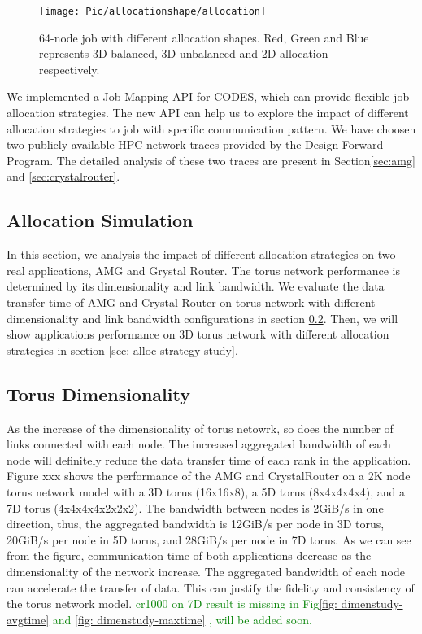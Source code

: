 \documentclass[conference]{IEEEtran}
\begin{document}
\begin{figure}[h!] 
  \centering
  \texttt{[image: Pic/allocationshape/allocation]}
  \caption{64-node job with different allocation shapes. Red, Green and Blue represents 3D balanced, 3D unbalanced and 2D allocation respectively. }
  \label{fig: allocation}
\end{figure}

We implemented a Job Mapping API for CODES, which can provide flexible job allocation strategies. The new API can help us to explore the impact of different allocation strategies to job with specific communication pattern. We have choosen two publicly available HPC network traces provided by the Design Forward Program\cite{design forward webpage}. The detailed analysis of these two traces are present in Section\ref{sec:amg} and \ref{sec:crystalrouter}.


\subsection{Allocation Simulation}
\label{sec:alloc sim}

In this section, we analysis the impact of different allocation strategies on two real applications, AMG and Grystal Router. The torus network performance is determined by its dimensionality and link bandwidth. We evaluate the data transfer time of AMG and Crystal Router on torus network with different dimensionality and link bandwidth configurations in section \ref{sec: dimensionality study}. Then, we will show applications performance on 3D torus network with different allocation strategies in section \ref{sec: alloc strategy study}.

\subsection{Torus Dimensionality}
\label{sec: dimensionality study}

As the increase of the dimensionality of torus netowrk, so does the number of links connected with each node. The increased aggregated bandwidth of each node will definitely reduce the data transfer time of each rank in the application. Figure xxx shows the performance of the AMG and CrystalRouter on a 2K node torus network model with a 3D torus (16x16x8), a 5D torus (8x4x4x4x4), and a 7D torus (4x4x4x4x2x2x2). The bandwidth between nodes is 2GiB/s in one direction, thus, the aggregated bandwidth is 12GiB/s per node in 3D torus, 20GiB/s per node in 5D torus, and 28GiB/s per node in 7D torus. As we can see from the figure, communication time of both applications decrease as the dimensionality of the network increase. The aggregated bandwidth of each node can accelerate the transfer of data. This can justify the fidelity and consistency of the torus network model.
\textcolor{green}{cr1000 on 7D result is missing in Fig\ref{fig: dimenstudy-avgtime} and \ref{fig: dimenstudy-maxtime} , will be added soon.}
\end{document}

